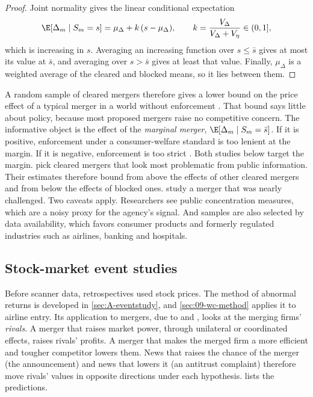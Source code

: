 \begin{proof}
Joint normality gives the linear conditional expectation
\begin{equation*}
\E[\Delta_m\mid S_m=s]=\mu_\Delta+k\,(s-\mu_\Delta),\qquad k=\frac{V_\Delta}{V_\Delta+V_\eta}\in(0,1],
\end{equation*}
which is increasing in $s$. Averaging an increasing function over $s\le\bar s$ gives at most its value at $\bar
s$, and averaging over $s>\bar s$ gives at least that value. Finally, $\mu_\Delta$ is a weighted average of the
cleared and blocked means, so it lies between them.
\end{proof}

A random sample of cleared mergers therefore gives a lower bound on the price effect of a typical merger in a
world without enforcement \citep{Carlton2009}. That bound says little about policy, because most proposed
mergers raise no competitive concern. The informative object is the effect of the \emph{marginal merger},
$\E[\Delta_m\mid S_m=\bar s]$. If it is positive, enforcement under a consumer-welfare standard is too lenient at
the margin. If it is negative, enforcement is too strict \citep{AshenfelterHoskenWeinberg2013}. Both studies below
target the margin. \citet{AshenfelterHosken2010} pick cleared mergers that look most problematic from public
information. Their estimates therefore bound from above the effects of other cleared mergers and from below the
effects of blocked ones. \citet{AshenfelterHoskenWeinberg2013} study a merger that was nearly challenged. Two caveats
apply. Researchers see public concentration measures, which are a noisy proxy for the agency's signal. And
samples are also selected by data availability, which favors consumer products and formerly regulated
industries such as airlines, banking and hospitals.

\subsection{Stock-market event studies}\label{sec:11-retro-event}

Before scanner data, retrospectives used stock prices. The method of abnormal returns is developed in
\cref{sec:A-eventstudy}, and \cref{sec:09-wc-method} applies it to airline entry. Its application to mergers, due to \citet{Eckbo1983} and \citet{Stillman1983}, looks at
the merging firms' \emph{rivals}. A merger that raises market power, through unilateral or coordinated effects,
raises rivals' profits. A merger that makes the merged firm a more efficient and tougher competitor lowers them.
News that raises the chance of the merger (the announcement) and news that lowers it (an antitrust complaint)
therefore move rivals' values in opposite directions under each hypothesis.  lists the
predictions.

